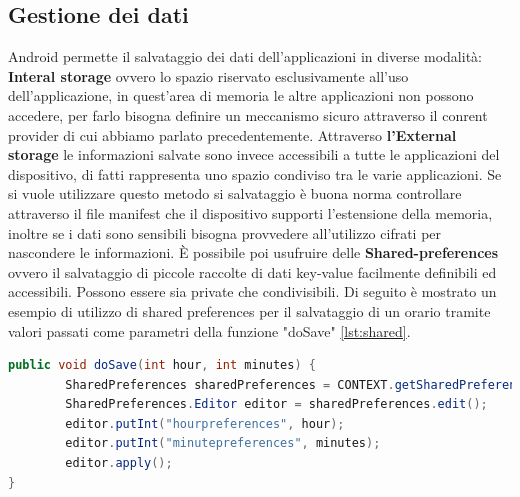 \subsection{Gestione dei dati}
Android permette il salvataggio dei dati dell'applicazioni in diverse modalità: \textbf{Interal storage} ovvero lo spazio riservato esclusivamente all'uso dell'applicazione, in quest'area di memoria le altre applicazioni non possono accedere, per farlo bisogna definire un meccanismo sicuro attraverso il conrent provider di cui abbiamo parlato precedentemente. Attraverso \textbf{l'External storage} le informazioni salvate sono invece accessibili a tutte le applicazioni del dispositivo, di fatti rappresenta uno spazio condiviso tra le varie applicazioni. Se si vuole utilizzare questo metodo si salvataggio è buona norma controllare attraverso il file manifest che il dispositivo supporti l'estensione della memoria, inoltre se i dati sono sensibili bisogna provvedere all'utilizzo cifrati per nascondere le informazioni. È possibile poi usufruire delle \textbf{Shared-preferences} ovvero il salvataggio di piccole raccolte di dati key-value facilmente definibili ed accessibili. Possono essere sia private che condivisibili. Di seguito è mostrato un esempio di utilizzo di shared preferences per il salvataggio di un orario tramite valori passati come parametri della funzione "doSave" \ref{lst:shared}. 
\begin{lstlisting}[language=Java, caption=Shared Preference example, label= lst:shared]
public void doSave(int hour, int minutes) {
        SharedPreferences sharedPreferences = CONTEXT.getSharedPreferences("DispensaSetting", Context.MODE_PRIVATE);
        SharedPreferences.Editor editor = sharedPreferences.edit();
        editor.putInt("hourpreferences", hour);
        editor.putInt("minutepreferences", minutes);
        editor.apply();
}
\end{lstlisting}
